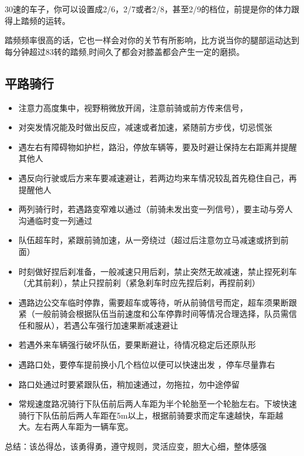 \documentclass{ctexbook}
\begin{document}
30速的车子，你可以设置成2/6，2/7或者2/8，甚至2/9的档位，前提是你的体力跟得上踏频的运转。

踏频频率很高的话，它也一样会对你的关节有所影响，比方说当你的腿部运动达到每分钟超过83转的踏频,时间久了都会对膝盖都会产生一定的磨损。

\subsection{平路骑行}
\begin{itemize}

    \item 注意力高度集中，视野稍微放开阔，注意前骑或前方传来信号，

    \item 对突发情况能及时做出反应，减速或者加速，紧随前方步伐，切忌慌张

    \item 遇左右有障碍物如护栏，路沿，停放车辆等，要及时避让保持左右距离并提醒其他人

    \item 遇反向行驶或后方来车要减速避让，若两边均来车情况较乱首先稳住自己，再提醒他人 

    \item 两列骑行时，若遇路变窄难以通过（前骑未发出变一列信号），要主动与旁人沟通临时变一列通过

    \item 队伍超车时，紧跟前骑加速，从一旁绕过（超过后注意勿立马减速或挤到前面）

    \item 时刻做好捏后刹准备，一般减速只用后刹，禁止突然无故减速，禁止捏死刹车（尤其前刹），禁止只捏前刹（紧急刹车时应先捏后刹，再捏前刹）

    \item 遇路边公交车临时停靠，需要超车或等待，听从前骑信号而定，超车须果断跟紧（一般前骑会根据队伍当前速度和公车停靠时间等情况合理选择，队员需信任和服从），若遇公车强行加速果断减速避让

    \item 若遇外来车辆强行破坏队伍，要果断避让，待情况稳定后还原队形

    \item 遇路口处，要停车提前换小几个档位以便可以快速出发 ，停车尽量靠右

    \item 路口处通过时要紧跟队伍，稍加速通过，勿拖拉，勿中途停留

    \item 常规速度路况骑行下队伍前后两人车距为半个轮胎至一个轮胎左右。下坡快速骑行下队伍前后两人车距在5m以上，根据前骑要求而定车速越快，车距越大。左右两人车距为一辆车宽。
\end{itemize}
总结：该怂得怂，该勇得勇，遵守规则，灵活应变，胆大心细，整体感强
\end{document}

